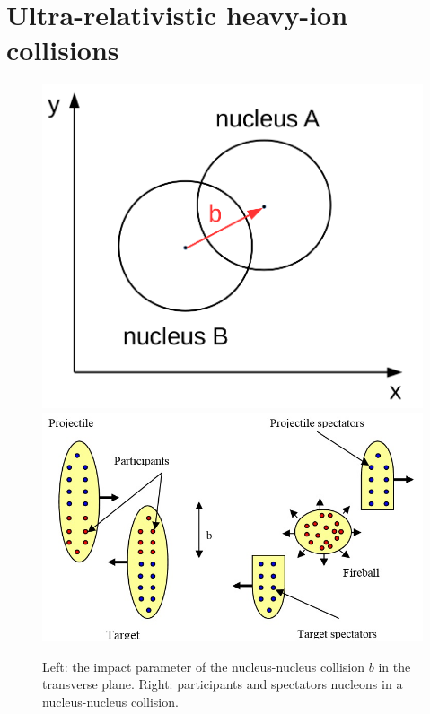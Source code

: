 \documentclass[b5paper,10pt,twoside,oldstyle,classica]{toptesi}
\begin{document}
\section{Ultra-relativistic heavy-ion collisions}
\label{collisions_sec}
\begin{figure}[b]
\begin{center}
{\includegraphics[scale = 0.23]{b.png}}
\hspace{0cm}
{\includegraphics[scale = 0.33]{participants.jpg}}
\caption{Left: the impact parameter of the nucleus-nucleus collision $b$ in the transverse plane. Right: participants and spectators nucleons in a nucleus-nucleus collision.}
\label{participants}
\end{center}
\end{figure}
\end{document}

